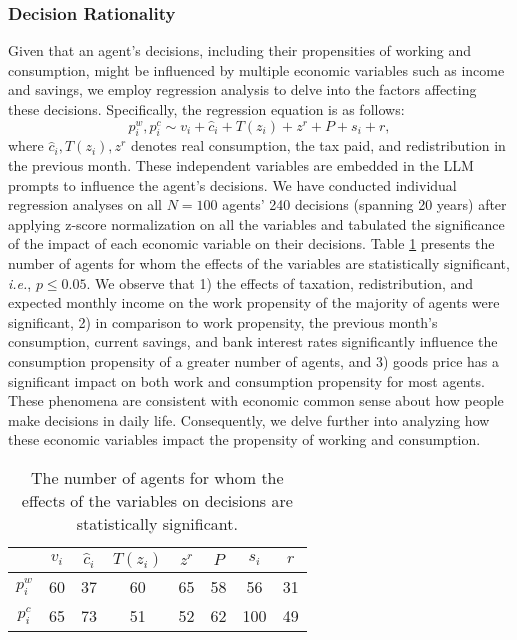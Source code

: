 \subsubsection{Decision Rationality}
Given that an agent's decisions, including their propensities of working and consumption, might be influenced by multiple economic variables such as income and savings, we employ regression analysis to delve into the factors affecting these decisions. Specifically, the regression equation is as follows:
\begin{equation}
    p^w_i, p^c_i \sim v_i + \hat{c}_i + T(z_i) + z^r + P + s_i + r,
\end{equation}
where $\hat{c}_i, T(z_i), z^r$ denotes real consumption, the tax paid, and redistribution in the previous month. These independent variables are embedded in the LLM prompts to influence the agent's decisions. We have conducted individual regression analyses on all $N=100$ agents' 240 decisions (spanning 20 years) after applying z-score normalization on all the variables and tabulated the significance of the impact of each economic variable on their decisions. Table \ref{table:num_agents} presents the number of agents for whom the effects of the variables are statistically significant, \textit{i.e.}, $p \leq 0.05$. We observe that 1) the effects of taxation, redistribution, and expected monthly income on the work propensity of the majority of agents were significant, 2) in comparison to work propensity, the previous month's consumption, current savings, and bank interest rates significantly influence the consumption propensity of a greater number of agents, and 3) goods price has a significant impact on both work and consumption propensity for most agents. These phenomena are consistent with economic common sense about how people make decisions in daily life. Consequently, we delve further into analyzing how these economic variables impact the propensity of working and consumption.

\begin{table}[t]
\caption{The number of agents for whom the effects of the variables on decisions are statistically significant.}
    \centering
    \begin{tabular}{c|c|c|c|c|c|c|c}
    \toprule
     & $v_i$ & $\hat{c}_i$ & $T(z_i)$ & $z^r$ & $P$ & $s_i$ & $r$\\
    \hline
    $p^w_i$ & 60 & 37 & 60	& 65 & 58& 56& 31 \\
    $p^c_i$ & 65 & 73 & 51 & 52 & 62 & 100 & 49 \\
    \bottomrule
    \end{tabular}
    \label{table:num_agents}
\end{table}

